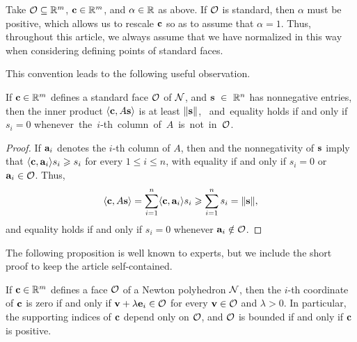 \documentclass[11pt]{amsart}
\begin{document}
\begin{convention}
\label{alpha=1: convention}
Take $\mathcal{O} \subseteq \mathbb{R}^m$, $\mathbf{c} \in \mathbb{R}^m$, and $\alpha \in \mathbb{R}$ as above.  If $\mathcal{O}$ is standard, then $\alpha$ must be positive, which allows us to rescale $\mathbf{c}$ so as to assume that $\alpha = 1$.   Thus, throughout this article, we always assume that we have normalized in this way when considering defining points of standard faces.
\end{convention}

This convention leads to the following useful observation.

\begin{proposition}\label{prop: inner product with columns of A}
   If $\mathbf{c} \in \mathbb{R}^m$ defines a standard face $\mathcal{O}$ of $\mathcal{N}$, and $\mathbf{s}~\in~\mathbb{R}^n$ has nonnegative entries, then the inner product $\langle \mathbf{c}, A\mathbf{s} \rangle$ is at least $\| \mathbf{s} \|$, ~and~equality holds if and only if $s_i = 0$ whenever~the~$i$-th~column~of~$A$~is~not~in~$\mathcal{O}$.
\end{proposition}

\begin{proof}
If $\mathbf{a}_i$ denotes the $i$-th column of $A$, then  and the nonnegativity of $\mathbf{s}$ imply that $\langle \mathbf{c}, \mathbf{a}_i \rangle  s_i \geqslant s_i$ for every $1 \leq i \leq n$, with equality if and only if $s_i = 0$ or $\mathbf{a}_i \in \mathcal{O}$.
Thus,
\[ \langle \mathbf{c}, A\mathbf{s} \rangle = \sum_{i=1}^n \langle \mathbf{c}, \mathbf{a}_i \rangle s_i \geqslant  \sum_{i=1}^n s_i  = \| \mathbf{s} \|,\]
and equality holds if and only if $s_i = 0$ whenever $\mathbf{a}_i \notin \mathcal{O}$.
\end{proof}

The following proposition is well known to experts, but we include the short proof to keep the article self-contained.

\begin{proposition}
   \label{face: P}
   If $\mathbf{c} \in \mathbb{R}^m$ defines a face $\mathcal{O}$ of a Newton polyhedron $\mathcal{N}$, then the $i$-th coordinate of $\mathbf{c}$ is zero if and only if $\mathbf{v} + \lambda \mathbf{e}_i \in \mathcal{O}$  for every $\mathbf{v} \in \mathcal{O}$ and $\lambda > 0$.
   In particular, the supporting indices of $\mathbf{c}$ depend only on $\mathcal{O}$, and $\mathcal{O}$ is bounded if and only if $\mathbf{c}$ is positive.
\end{proposition}
\end{document}
